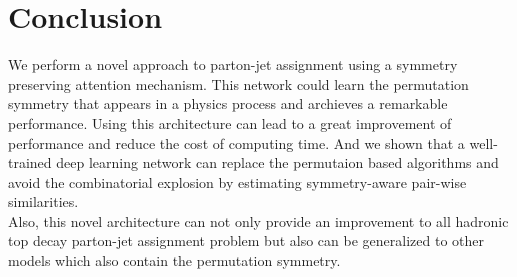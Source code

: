 \chapter{Conclusion}

We perform a novel approach to parton-jet assignment using a symmetry preserving attention mechanism. This network could learn the permutation symmetry that appears in a physics process and archieves a remarkable performance. Using this architecture can lead to a great improvement of performance and reduce the cost of computing time. And we shown that a well-trained deep learning network can replace the permutaion based algorithms and avoid the combinatorial explosion by estimating symmetry-aware pair-wise similarities.
\\
Also, this novel architecture can not only provide an improvement to all hadronic top decay parton-jet assignment problem but also can be generalized to other models which also contain the permutation symmetry. 